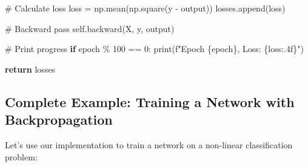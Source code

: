 \documentclass[
  letterpaper,
  DIV=11,
  numbers=noendperiod]{scrreprt}
\newenvironment{Shaded}{\begin{snugshade}}{\end{snugshade}}
\newcommand{\BuiltInTok}[1]{\textcolor[rgb]{0.00,0.23,0.31}{#1}}
\newcommand{\CommentTok}[1]{\textcolor[rgb]{0.37,0.37,0.37}{#1}}
\newcommand{\ControlFlowTok}[1]{\textcolor[rgb]{0.00,0.23,0.31}{\textbf{#1}}}
\newcommand{\DecValTok}[1]{\textcolor[rgb]{0.68,0.00,0.00}{#1}}
\newcommand{\NormalTok}[1]{\textcolor[rgb]{0.00,0.23,0.31}{#1}}
\newcommand{\OperatorTok}[1]{\textcolor[rgb]{0.37,0.37,0.37}{#1}}
\newcommand{\SpecialCharTok}[1]{\textcolor[rgb]{0.37,0.37,0.37}{#1}}
\newcommand{\SpecialStringTok}[1]{\textcolor[rgb]{0.13,0.47,0.30}{#1}}
\newcommand{\VariableTok}[1]{\textcolor[rgb]{0.07,0.07,0.07}{#1}}
\begin{document}
\begin{Shaded}
\begin{Highlighting}[]
            \CommentTok{\# Calculate loss}
\NormalTok{            loss }\OperatorTok{=}\NormalTok{ np.mean(np.square(y }\OperatorTok{{-}}\NormalTok{ output))}
\NormalTok{            losses.append(loss)}
            
            \CommentTok{\# Backward pass}
            \VariableTok{self}\NormalTok{.backward(X, y, output)}
            
            \CommentTok{\# Print progress}
            \ControlFlowTok{if}\NormalTok{ epoch }\OperatorTok{\%} \DecValTok{100} \OperatorTok{==} \DecValTok{0}\NormalTok{:}
                \BuiltInTok{print}\NormalTok{(}\SpecialStringTok{f"Epoch }\SpecialCharTok{\{}\NormalTok{epoch}\SpecialCharTok{\}}\SpecialStringTok{, Loss: }\SpecialCharTok{\{}\NormalTok{loss}\SpecialCharTok{:.4f\}}\SpecialStringTok{"}\NormalTok{)}
        
        \ControlFlowTok{return}\NormalTok{ losses}
\end{Highlighting}
\end{Shaded}

\subsection{Complete Example: Training a Network with
Backpropagation}\label{complete-example-training-a-network-with-backpropagation}

Let's use our implementation to train a network on a non-linear
classification problem:
\end{document}
